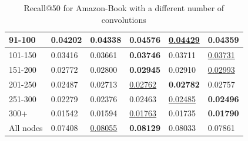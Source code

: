 \begin{table}[]
\begin{tabular}{|l|l|l|l|l|l|}
        91-100    & 0.04202                    & 0.04338                    & \textbf{0.04576}           & \underline{0.04429}        & 0.04359                    \\ \hline
        101-150   & 0.03416                    & 0.03661                    & \textbf{0.03746}           & 0.03711                    & \underline{0.03731}        \\ \hline
        151-200   & 0.02772                    & 0.02800                    & \textbf{0.02945}           & 0.02910                    & \underline{0.02993}        \\ \hline
        201-250   & 0.02487                    & 0.02713                    & \underline{0.02762}        & \textbf{0.02782}           & 0.02757                    \\ \hline
        251-300   & 0.02279                    & 0.02376                    & 0.02463                    & \underline{0.02485}        & \textbf{0.02496}           \\ \hline
        300+      & 0.01542                    & 0.01594                    & \underline{0.01763}        & 0.01735                    & \textbf{0.01790}           \\ \hline
        All nodes   & 0.07408                    & \underline{0.08055}        & \textbf{0.08129}           & 0.08033                    & 0.07861                    \\ \hline
    \end{tabular}
    \caption{Recall@50 for Amazon-Book with a different number of convolutions}
    \label{tab:Amazon-book-recall-evaluation-mean}
\end{table}

